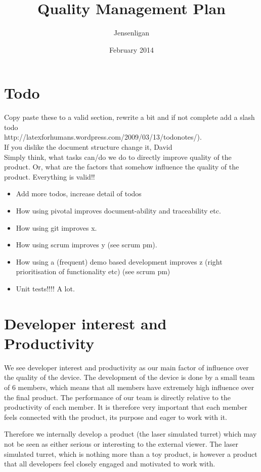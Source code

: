 \documentclass{article}
\title{Quality Management Plan}
\author{Jensenligan}
\date{February 2014}
\begin{document}
\maketitle

\section{Todo}


Copy paste these to a valid section, rewrite a bit and if not complete add a slash todo \\
http://latexforhumans.wordpress.com/2009/03/13/todonotes/).\\If you dislike the document structure change it, David
\\
Simply think, what tasks can/do we do to directly improve quality of the product. Or, what are the factors that somehow influence the quality of the product. Everything is valid!!
\begin{itemize}
\item Add more todos, increase detail of todos
\item How using pivotal improves document-ability and traceability etc.
\item How using git improves x.
\item How using scrum improves y (see scrum pm).
\item How using a (frequent) demo based development improves z (right prioritisation of functionality etc) (see scrum pm)
\item Unit tests!!!! A lot.
\end{itemize}


\section{Developer interest and Productivity}
We see developer interest and productivity as our main factor of influence over the quality of the device. 
The development of the device is done by a small team of 6 members, which means that all members have extremely high influence over the final product.
The performance of our team is directly relative to the productivity of each member.
It is therefore very important that each member feels connected with the product, its purpose and eager to work with it. 

Therefore we internally develop a product (the laser simulated turret) which may not be seen as either serious or interesting to the external viewer.
The laser simulated turret, which is nothing more than a toy product, is however a product that all developers feel closely engaged and motivated to work with.
\end{document}
